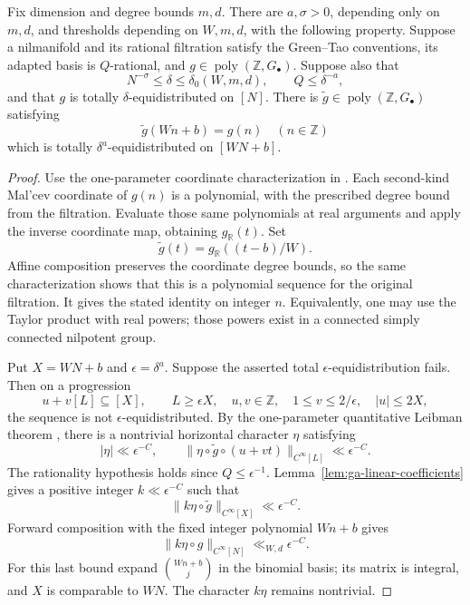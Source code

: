 \begin{lemma}
\label{lem:ga-affine-interpolation}
Fix dimension and degree bounds $m,d$. There are $a,\sigma>0$, depending
only on $m,d$, and thresholds depending on $W,m,d$, with the following
property. Suppose a nilmanifold and its rational filtration satisfy the
Green--Tao conventions, its adapted basis is $Q$-rational, and
$g\in\operatorname{poly}(\mathbb Z,G_\bullet)$. Suppose also that
\[
 N^{-\sigma}\leq\delta\leq\delta_0(W,m,d),\qquad
 Q\leq\delta^{-a},
\]
and that $g$ is totally $\delta$-equidistributed on $[N]$. There is
$\widetilde g\in\operatorname{poly}(\mathbb Z,G_\bullet)$ satisfying
\[
 \widetilde g(Wn+b)=g(n)\quad(n\in\mathbb Z)
\]
which is totally $\delta^a$-equidistributed on $[WN+b]$.
\end{lemma}
\begin{proof}
Use the one-parameter coordinate characterization in
\cite[Lemma 6.7]{GTOrbits2012}. Each second-kind Mal'cev coordinate of
$g(n)$ is a polynomial, with the prescribed degree bound from the
filtration. Evaluate those same polynomials at real arguments and apply
the inverse coordinate map, obtaining $g_{\mathbb R}(t)$. Set
\[
 \widetilde g(t)=g_{\mathbb R}((t-b)/W).
\]
Affine composition preserves the coordinate degree bounds, so the same
characterization shows that this is a polynomial sequence for the
original filtration. It gives the stated identity on integer $n$.
Equivalently, one may use the Taylor product with real powers; those
powers exist in a connected simply connected nilpotent group.

Put $X=WN+b$ and $\epsilon=\delta^a$. Suppose the asserted total
$\epsilon$-equidistribution fails. Then on a progression
\[
 u+v[L]\subseteq[X],\qquad L\geq\epsilon X,
 \quad u,v\in\mathbb Z,\quad
 1\leq v\leq2/\epsilon,\quad |u|\leq2X,
\]
the sequence is not $\epsilon$-equidistributed. By the one-parameter
quantitative Leibman theorem \cite[Theorem 2.9]{GTOrbits2012}, there is
a nontrivial horizontal character $\eta$ satisfying
\[
 |\eta|\ll\epsilon^{-C},\qquad
 \|\eta\circ\widetilde g\circ(u+vt)\|_{C^\infty[L]}
       \ll\epsilon^{-C}.
\]
The rationality hypothesis holds since $Q\leq\epsilon^{-1}$.
Lemma~\ref{lem:ga-linear-coefficients} gives a positive integer
$k\ll\epsilon^{-C}$ such that
\[
 \|k\eta\circ\widetilde g\|_{C^\infty[X]}
      \ll\epsilon^{-C}.
\]
Forward composition with the fixed integer polynomial $Wn+b$ gives
\[
 \|k\eta\circ g\|_{C^\infty[N]}
      \ll_{W,d}\epsilon^{-C}.
\]
For this last bound expand $\binom{Wn+b}j$ in the binomial basis; its
matrix is integral, and $X$ is comparable to $WN$. The character
$k\eta$ remains nontrivial.


\end{proof}
